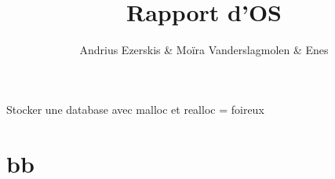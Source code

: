 \documentclass{article}
\title{Rapport d'OS}
\author{Andrius Ezerskis \& Moïra Vanderslagmolen \& Enes}
\begin{document}
Stocker une database avec malloc et realloc = foireux


\section{bb}
\end{document}
